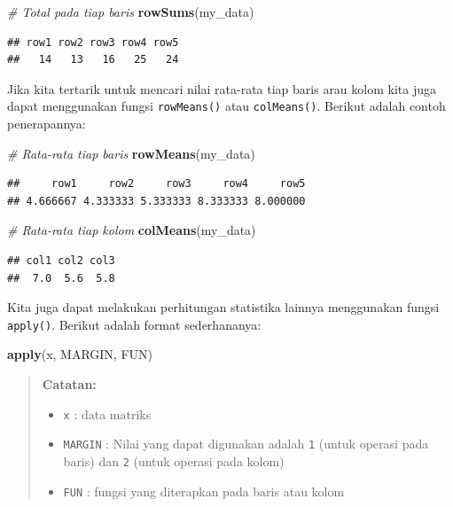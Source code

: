 \documentclass[]{book}
\newenvironment{Shaded}{\begin{snugshade}}{\end{snugshade}}
\newcommand{\CommentTok}[1]{\textcolor[rgb]{0.56,0.35,0.01}{\textit{#1}}}
\newcommand{\KeywordTok}[1]{\textcolor[rgb]{0.13,0.29,0.53}{\textbf{#1}}}
\newcommand{\NormalTok}[1]{#1}
\providecommand{\tightlist}{%
  \setlength{\itemsep}{0pt}\setlength{\parskip}{0pt}}
\theoremstyle{definition}
\theoremstyle{definition}
\theoremstyle{definition}
\theoremstyle{remark}
\begin{document}
\begin{Shaded}
\begin{Highlighting}[]
\CommentTok{# Total pada tiap baris}
\KeywordTok{rowSums}\NormalTok{(my_data)}
\end{Highlighting}
\end{Shaded}

\begin{verbatim}
## row1 row2 row3 row4 row5 
##   14   13   16   25   24
\end{verbatim}

Jika kita tertarik untuk mencari nilai rata-rata tiap baris arau kolom kita juga dapat menggunakan fungsi \texttt{rowMeans()} atau \texttt{colMeans()}. Berikut adalah contoh penerapannya:

\begin{Shaded}
\begin{Highlighting}[]
\CommentTok{# Rata-rata tiap baris}
\KeywordTok{rowMeans}\NormalTok{(my_data)}
\end{Highlighting}
\end{Shaded}

\begin{verbatim}
##     row1     row2     row3     row4     row5 
## 4.666667 4.333333 5.333333 8.333333 8.000000
\end{verbatim}

\begin{Shaded}
\begin{Highlighting}[]
\CommentTok{# Rata-rata tiap kolom}
\KeywordTok{colMeans}\NormalTok{(my_data)}
\end{Highlighting}
\end{Shaded}

\begin{verbatim}
## col1 col2 col3 
##  7.0  5.6  5.8
\end{verbatim}

Kita juga dapat melakukan perhitungan statistika lainnya menggunakan fungsi \texttt{apply()}. Berikut adalah format sederhananya:

\begin{Shaded}
\begin{Highlighting}[]
\KeywordTok{apply}\NormalTok{(x, MARGIN, FUN)}
\end{Highlighting}
\end{Shaded}

\begin{quote}
\textbf{Catatan:}

\begin{itemize}
\tightlist
\item
  \texttt{x} : data matriks
\item
  \texttt{MARGIN} : Nilai yang dapat digunakan adalah \texttt{1} (untuk operasi pada baris) dan \texttt{2} (untuk operasi pada kolom)
\item
  \texttt{FUN} : fungsi yang diterapkan pada baris atau kolom
\end{itemize}
\end{quote}
\end{document}
